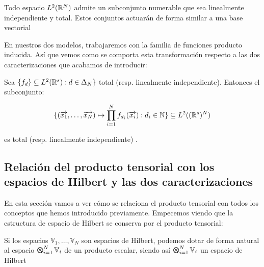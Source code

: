 \begin{proposicion}
    Todo espacio $L^2(\mathbb{R}^N)$ admite un subconjunto numerable que sea linealmente independiente y total. Estos conjuntos actuarán de forma similar a una base vectorial
\end{proposicion}

En nuestros dos modelos, trabajaremos con la familia de funciones producto inducida. Así que vemos como se comporta esta transformación respecto a las dos caracterizaciones que acabamos de introducir:

\begin{proposicion} \label{prop:conservacion_totalidad_indp_lineal_func_prod}
    Sea $\{f_d\} \subseteq L^2(\mathbb{R}^s): d \in \Delta_{N} \}$ total (resp. linealmente independiente). Entonces el subconjunto:

    \begin{equation}
        \{ (\overrightarrow{x_1}, \ldots, \overrightarrow{x_N}) \mapsto \prod_{i = 1}^N f_{d_i}(\overrightarrow{x_i}): d_i \in \mathbb{N} \} \subseteq L^2((\mathbb{R}^s)^N)
    \end{equation}

    es total (resp. linealmente independiente) \cite{matematicas:descomposicion_ht}.
\end{proposicion}

\subsection{Relación del producto tensorial con los espacios de Hilbert y las dos caracterizaciones}

En esta sección vamos a ver cómo se relaciona el producto tensorial con todos los conceptos que hemos introducido previamente. Empecemos viendo que la estructura de espacio de Hilbert se conserva por el producto tensorial:

\begin{proposicion}

    Si los espacios $\mathbb{V}_1, \ldots, \mathbb{V}_N$ son espacios de Hilbert, podemos dotar de forma natural al espacio $\MediumOtimes_{i = 1}^N \mathbb{V}_i$ de un producto escalar, siendo así $\MediumOtimes_{i = 1}^N \mathbb{V}_i$ un espacio de Hilbert

\end{proposicion}

